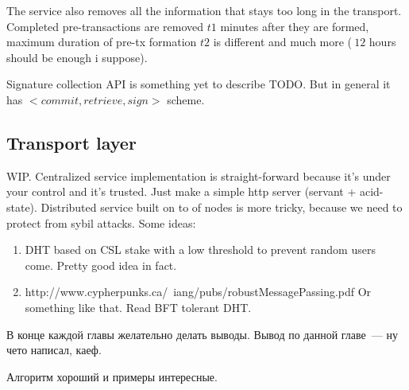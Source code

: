 \documentclass[]{itmo-student-thesis}
\begin{document}
The service also removes all the information that stays too long in
the transport. Completed pre-transactions are removed $t1$ minutes
after they are formed, maximum duration of pre-tx formation $t2$ is
different and much more ($~12$ hours should be enough i suppose).

Signature collection API is something yet to describe TODO. But in
general it has $<commit, retrieve, sign>$ scheme.

\subsection{Transport layer}

WIP. Centralized service implementation is straight-forward because
it’s under your control and it’s trusted. Just make a simple http
server (servant + acid-state). Distributed service built on to of
nodes is more tricky, because we need to protect from sybil
attacks. Some ideas:

\begin{enumerate}
\item DHT based on CSL stake with a low threshold to prevent random
  users come. Pretty good idea in fact.
\item http://www.cypherpunks.ca/~iang/pubs/robustMessagePassing.pdf Or
  something like that. Read BFT tolerant DHT.
\end{enumerate}

\chapterconclusion

В конце каждой главы желательно делать выводы. Вывод по данной
главе~--- ну чето написал, каеф.


\startconclusionpage

Алгоритм хороший и примеры интересные.

\printmainbibliography
\end{document}
